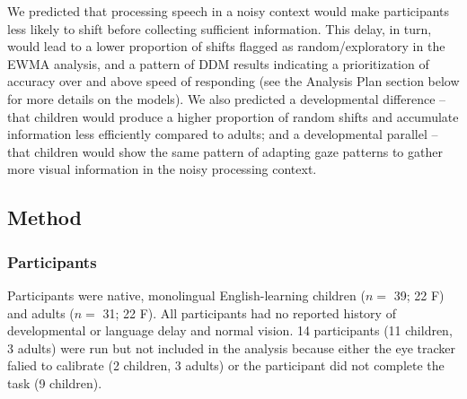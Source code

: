 \documentclass[10pt, letterpaper]{article}
\begin{document}
We predicted that processing speech in a noisy context would make
participants less likely to shift before collecting sufficient
information. This delay, in turn, would lead to a lower proportion of
shifts flagged as random/exploratory in the EWMA analysis, and a pattern
of DDM results indicating a prioritization of accuracy over and above
speed of responding (see the Analysis Plan section below for more
details on the models). We also predicted a developmental difference --
that children would produce a higher proportion of random shifts and
accumulate information less efficiently compared to adults; and a
developmental parallel -- that children would show the same pattern of
adapting gaze patterns to gather more visual information in the noisy
processing context.

\subsection{Method}\label{method}

\subsubsection{Participants}\label{participants}

Participants were native, monolingual English-learning children (\(n=\)
39; 22 F) and adults (\(n=\) 31; 22 F). All participants had no reported
history of developmental or language delay and normal vision. 14
participants (11 children, 3 adults) were run but not included in the
analysis because either the eye tracker falied to calibrate (2 children,
3 adults) or the participant did not complete the task (9 children).
\end{document}
